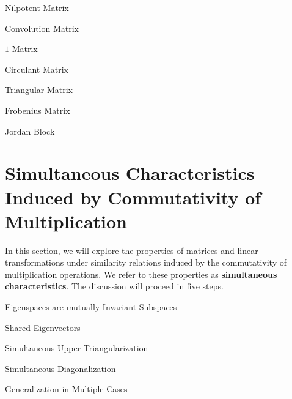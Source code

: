\documentclass[11pt]{../../TexTemplate/elegantbook} %
\begin{document}
\begin{leftbarTitle}{Nilpotent Matrix}\end{leftbarTitle}

\begin{leftbarTitle}{Convolution Matrix}\end{leftbarTitle}

\begin{leftbarTitle}{\(1\) Matrix}\end{leftbarTitle}

\begin{leftbarTitle}{Circulant Matrix}\end{leftbarTitle}

\begin{leftbarTitle}{Triangular Matrix}\end{leftbarTitle}

\begin{leftbarTitle}{Frobenius Matrix}\end{leftbarTitle}

\begin{leftbarTitle}{Jordan Block}\end{leftbarTitle}

\section{Simultaneous Characteristics Induced by Commutativity of Multiplication}
In this section, we will explore the properties of matrices and linear transformations under 
similarity relations induced by the commutativity of multiplication operations. 
We refer to these properties as \textbf{simultaneous characteristics}. The discussion will proceed in five steps.

\begin{leftbarTitle}{Eigenspaces are mutually Invariant Subspaces}\end{leftbarTitle}

\begin{leftbarTitle}{Shared Eigenvectors}\end{leftbarTitle}

\begin{leftbarTitle}{Simultaneous Upper Triangularization}\end{leftbarTitle}

\begin{leftbarTitle}{Simultaneous Diagonalization}\end{leftbarTitle}

\begin{leftbarTitle}{Generalization in Multiple Cases}\end{leftbarTitle}
\end{document}
